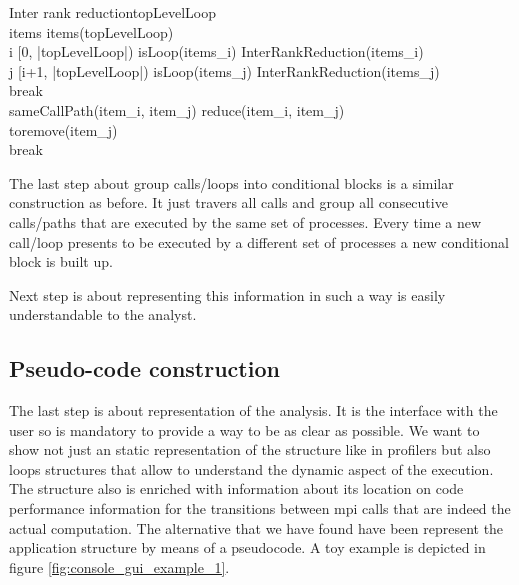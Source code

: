 \begin{pseudocode}{Inter rank reduction}{topLevelLoop}
\label{pc:inter_rank_reduction}
     \\
    items \GETS items(topLevelLoop) \\
    \FOR i \in [0, |topLevelLoop|) \DO
    \BEGIN
      \IF isLoop(items_{i}) \THEN
        InterRankReduction(items_{i}) \\
      \ELSE
      \BEGIN
        \FOR j \in [i+1, |topLevelLoop|) \DO
        \BEGIN
          \IF isLoop(items_{j}) \THEN
          \BEGIN
            InterRankReduction(items_{j}) \\
            break \\
          \END
          \ELSE
          \BEGIN
            \IF sameCallPath(item_{i}, item_{j}) \THEN
            \BEGIN
                reduce(item_{i}, item_{j}) \\
                toremove(item_{j}) \\
            \END
            \ELSE
                break \\
          \END
        \END
      \END
    \END
\end{pseudocode}

The last step about group calls/loops into conditional blocks is a similar
construction as before. It just travers all calls and group all consecutive
calls/paths that are executed by the same set of processes. Every time a new
call/loop presents to be executed by a different set of processes a new
conditional block is built up.

Next step is about representing this information in such a way is easily
understandable to the analyst.

\subsection{Pseudo-code construction}

The last step is about representation of the analysis. It is the interface with
the user so is mandatory to provide a way to be as clear as possible. We want to 
show not just an static representation of the structure like in profilers but
also loops structures that allow to understand the dynamic aspect of the
execution. The structure also is enriched with information about its location 
on code performance information for the transitions between mpi calls that 
are indeed the actual computation. The alternative that we have found have been 
represent the application structure by means of a pseudocode. A toy example is 
depicted in figure \ref{fig:console_gui_example_1}.


